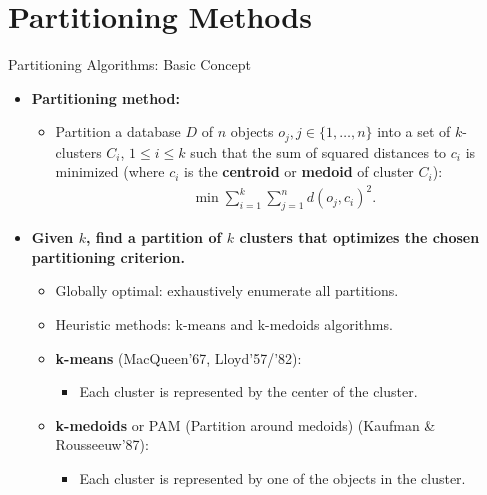 \section{Partitioning Methods}

\begin{frame}{Partitioning Algorithms: Basic Concept}
	\begin{itemize}
		\item \textbf{Partitioning method:}
		      \begin{itemize}
			      \item Partition a database $D$ of $n$ objects $o_j, j \in \{1,
				            \ldots, n\}$ into a set of $k$-clusters $C_i$, $1 \leq i \leq k$
			            such that the sum of squared distances to $c_i$ is minimized
			            (where $c_i$ is the \textbf{\color{airforceblue}centroid} or
			            \textbf{\color{airforceblue}medoid} of cluster $C_i$):
			            \begin{align*}
				            \min \sum_{i=1}^{k} \sum_{j=1}^{n} d(o_j,c_i)^2.
			            \end{align*}
		      \end{itemize}
		\item \textbf{Given $k$, find a partition of $k$ clusters that
			      optimizes the chosen partitioning criterion.}
		      \begin{itemize}
			      \item Globally optimal: exhaustively enumerate all partitions.
			      \item Heuristic methods: k-means and k-medoids algorithms.
			      \item \textbf{\color{airforceblue}k-means} (MacQueen'67,
			            Lloyd'57/'82):
			            \begin{itemize}
				            \item Each cluster is represented by the center of the cluster.
			            \end{itemize}
			      \item \textbf{\color{airforceblue}k-medoids} or PAM (Partition
			            around medoids) (Kaufman \& Rousseeuw'87):
			            \begin{itemize}
				            \item Each cluster is represented by one of the objects in the
				                  cluster.
			            \end{itemize}
		      \end{itemize}
	\end{itemize}
\end{frame}

